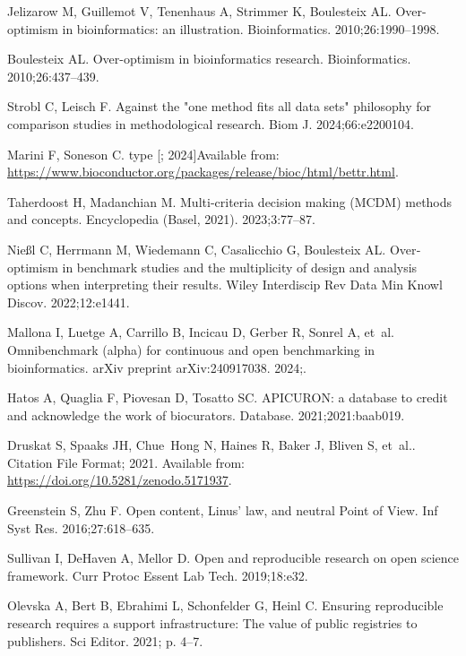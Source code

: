 \documentclass[11pt]{article}
\begin{document}
\begin{thebibliography}{10}
Jelizarow M, Guillemot V, Tenenhaus A, Strimmer K, Boulesteix AL.
\newblock Over-optimism in bioinformatics: an illustration.
\newblock Bioinformatics. 2010;26:1990--1998.

Boulesteix AL.
\newblock Over-optimism in bioinformatics research.
\newblock Bioinformatics. 2010;26:437--439.

Strobl C, Leisch F.
\newblock Against the "one method fits all data sets" philosophy for comparison
  studies in methodological research.
\newblock Biom J. 2024;66:e2200104.

Marini F, Soneson C. type [; 2024]Available from:
  \url{https://www.bioconductor.org/packages/release/bioc/html/bettr.html}.

Taherdoost H, Madanchian M.
\newblock Multi-criteria decision making ({MCDM}) methods and concepts.
\newblock Encyclopedia (Basel, 2021). 2023;3:77--87.

Nießl C, Herrmann M, Wiedemann C, Casalicchio G, Boulesteix AL.
\newblock Over‐optimism in benchmark studies and the multiplicity of design
  and analysis options when interpreting their results.
\newblock Wiley Interdiscip Rev Data Min Knowl Discov. 2022;12:e1441.

Mallona I, Luetge A, Carrillo B, Incicau D, Gerber R, Sonrel A, et~al.
\newblock Omnibenchmark (alpha) for continuous and open benchmarking in
  bioinformatics.
\newblock arXiv preprint arXiv:240917038. 2024;.

Hatos A, Quaglia F, Piovesan D, Tosatto SC.
\newblock APICURON: a database to credit and acknowledge the work of
  biocurators.
\newblock Database. 2021;2021:baab019.

Druskat S, Spaaks JH, Chue~Hong N, Haines R, Baker J, Bliven S, et~al..
  Citation File Format; 2021.
\newblock Available from: \url{https://doi.org/10.5281/zenodo.5171937}.

Greenstein S, Zhu F.
\newblock Open content, Linus’ law, and neutral Point of View.
\newblock Inf Syst Res. 2016;27:618--635.

Sullivan I, DeHaven A, Mellor D.
\newblock Open and reproducible research on open science framework.
\newblock Curr Protoc Essent Lab Tech. 2019;18:e32.

Olevska A, Bert B, Ebrahimi L, Schonfelder G, Heinl C.
\newblock Ensuring reproducible research requires a support infrastructure: The
  value of public registries to publishers.
\newblock Sci Editor. 2021; p. 4--7.


\end{thebibliography}
\end{document}
